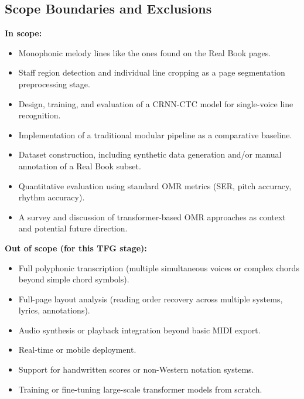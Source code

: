 \documentclass[11pt, a4paper]{article}
\begin{document}
\subsection{Scope Boundaries and Exclusions}
\textbf{In scope:}
\begin{itemize}
    \item Monophonic melody lines like the ones found on the Real Book pages.
    \item Staff region detection and individual line cropping as a page segmentation preprocessing stage.
    \item Design, training, and evaluation of a CRNN-CTC model for single-voice line recognition.
    \item Implementation of a traditional modular pipeline as a comparative baseline.
    \item Dataset construction, including synthetic data generation and/or manual annotation of a Real Book subset.
    \item Quantitative evaluation using standard OMR metrics (SER, pitch accuracy, rhythm accuracy).
    \item A survey and discussion of transformer-based OMR approaches as context and potential future direction.
\end{itemize}
\textbf{Out of scope (for this TFG stage):}
\begin{itemize}
    \item Full polyphonic transcription (multiple simultaneous voices or complex chords beyond simple chord symbols).
    \item Full-page layout analysis (reading order recovery across multiple systems, lyrics, annotations).
    \item Audio synthesis or playback integration beyond basic MIDI export.
    \item Real-time or mobile deployment.
    \item Support for handwritten scores or non-Western notation systems.
    \item Training or fine-tuning large-scale transformer models from scratch.
\end{itemize}
\end{document}
